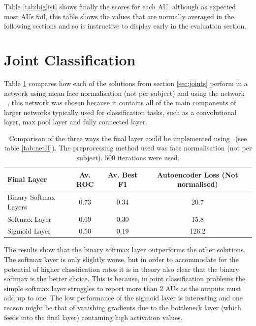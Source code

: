     Table \ref{tab:biglist} shows finally the scores for each AU, although as expected
    most AUs fail, this table shows the values that are normally averaged in the following sections
    and so is instructive to display early in the evaluation section.

  \clearpage
  \section{Joint Classification}
    Table \ref{tab:binsoftcomp} compares how each of the solutions from section \ref{sec:joints}
    perform in a network using mean face normalisation (not per subject) and using the network
    \networkII\
    , this network was chosen because it contains all of the
    main components of larger networks typically used for classification tasks,
    such as a convolutional layer, max pool layer and fully connected layer.

    \begin{table}[!h]
        {\footnotesize
        \centering
        \begin{tabular}{lccc}
        \hline
        Final Layer   & Av. ROC &   Av. Best F1 &   Autoencoder Loss (Not normalised) \\
        \hline
        Binary Softmax Layers  &   0.73 &  0.34 &   20.7 \\
        Softmax Layer          &   0.69 &  0.30 &   15.8 \\
        Sigmoid Layer          &   0.50 &  0.19 &  126.2 \\
        \hline
        \end{tabular}
      \caption{Comparison of the three ways the final layer could be implemented
      using \networkII\ (see table \ref{tab:netII}). The
      preprocessing method used was face normalisation (not per subject).
      500 iterations were used. }
      \label{tab:binsoftcomp}
      }
      \end{table}

      The results show that the binary softmax layer outperforms the other
      solutions. The softmax layer is only slightly worse, but in order to
      accommodate for the potential of higher classification rates it is in
      theory also clear that the binary
      softmax is the better choice. This is because, in joint classification
      problems the simple softmax layer struggles to report more than 2 AUs as
      the outputs must add up to one. The low performance of the sigmoid layer
      is interesting and one reason might be that of vanishing gradients due to
      the bottleneck layer (which feeds into the final layer) containing high activation values.

